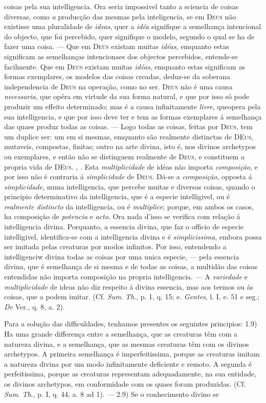 coisas pela sua intelligencia. Ora seria impossivel tanto a sciencia de coisas diversas, como \emph{a} producção das mesmas pela inteligencia, se em \textsc{Deus} não existisse uma pluralidade de \emph{ideas}, quer a \emph{idéa} signifique a semelhança intencional do objecto, que foi percebido, quer signifique o modelo, segundo o qual se ha de fazer uma coisa. --- Que em \textsc{Deus} existam muitas \emph{idéas}, emquanto estas significam as semelhanças intencionaes dos objectos percebidos, entende-se facilmente. Que em \textsc{Deus} existam muitas \emph{idéas}, emquanto estas significam as formas exemplares, os modelos das coisas creadas, deduz-se da soberana independencia de \textsc{Deus} na operação, como no ser. \textsc{Deus} não é uma causa \emph{necessaria}, que opéra em virtude da sua forma natural, e que por isso sô pode produzir um effeito determinado; mas é a causa infinitamente \emph{livre}, queopera pela sua intelligencia, e que por isso deve ter e tem as formas exemplares á semelhança das quaes produz todas as coisas. --- Logo todas as coisas, feitas por \textsc{Deus}, tem um duplice ser: um em si mesmas, emquanto são realmente distinctas de \textsc{DEus}, mutaveis, compostas, finitas; outro na arte divina, isto é, nos divinos archetypos ou exemplares, e então não se distinguem realmente de \textsc{Deus}, e constituem a propria vida de \textsc{DEus}. , . Esta \emph{multiplicidade} de idéas não importa \emph{composição}, e por isso não é contraria á \emph{simplicidade} de \textsc{Deus}. Dá-se a \emph{composição}, opposta á \emph{simplicidade}, numa intelligencia, que percebe muitas e diversas coisas, quando o principio determinativo da intelligencia, que é a especie intelligivel, ou é \emph{realmente distincto} da intelligencia, ou é \emph{multiplice}; porque, em ambos os casos, ha composição de \emph{potencia} e \emph{acto}. Ora nada d'isso se verifica com relação á intelligencia divina. Porquanto, a essencia divina, que faz o officio de especie intelligivel, identifica-se com a intelligencia divina e é \emph{simplicissima}, embora possa ser imitada pelas creaturas por modos infinitos. Por isso, entendendo a intelligenciw divina todas as coisas por uma unica especie, --- pela essencia divina, que é semelhança de si mesma e de todas as coisas, a multidão das coisas entendidas não importa composição na propria intelligencia. --- A \emph{variedade} e \emph{multiplicidade} de ideas não diz respeito á divina essencia, mas aos termos ou ás coisas, que a podem imitar. (Cf. \emph{Sum}. \emph{Th}., p. 1, q. 15; e. \emph{Gentes}, l. I, e. 51 e seg.; \emph{De} Ver., q. 8, a. 2).\par Para a solução das difficuldades, tenhamos presentes os seguintes principios: 1.9) Ha uma grande differença entre a semelhança, que as creaturas têm com a natureza divina, e a semelhança, que as mesmas creaturas têm com os divinos archetypos. A primeira semelhança é imperfeitissima, porque as creaturas imitam a natureza divina por um modo infinitamente deficiente e remoto. A segunda é perfeitissima, porque as creaturas representam adequadamente, na sua entidade, os divinos archetypos, em conformidade com os quaes foram produzidas. (Cf. \emph{Sum}. \emph{Th}., p. I, q. 44, a. 8 ad 1). --- 2.9) Se o conhecimento divino se 